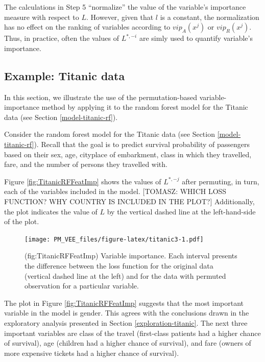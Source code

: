 \documentclass[12pt,]{krantz}
\begin{document}
The calculations in Step 5 ``normalize'' the value of the variable's importance measure with respect to \(L\). However, given that \(l\) is a constant, the normalization has no effect on the ranking of variables according to \(vip_A(x^j)\) or \(vip_R(x^j)\). Thus, in practice, often the values of \(L^{*,-i}\) are simly used to quantify variable's importance.

\hypertarget{featureImportanceTitanic}{%
\subsection{Example: Titanic data}\label{featureImportanceTitanic}}

In this section, we illustrate the use of the permutation-based variable-importance method by applying it to the random forest model for the Titanic data (see Section \ref{model-titanic-rf}).

Consider the random forest model for the Titanic data (see Section \ref{model-titanic-rf}). Recall that the goal is to predict survival probability of passengers based on their sex, age, cityplace of embarkment, class in which they travelled, fare, and the number of persons they travelled with.

Figure \ref{fig:TitanicRFFeatImp} shows the values of \(L^{*,-j}\) after permuting, in turn, each of the variables included in the model. {[}TOMASZ: WHICH LOSS FUNCTION? WHY COUNTRY IS INCLUDED IN THE PLOT?{]} Additionally, the plot indicates the value of \(L\) by the vertical dashed line at the left-hand-side of the plot.

\begin{figure}
\centering
\texttt{[image: PM\_VEE\_files/figure-latex/titanic3-1.pdf]}
\caption{\label{fig:titanic3}(fig:TitanicRFFeatImp) Variable importance. Each interval presents the difference between the loss function for the original data (vertical dashed line at the left) and for the data with permuted observation for a particular variable.}
\end{figure}

The plot in Figure \ref{fig:TitanicRFFeatImp} suggests that the most important variable in the model is gender. This agrees with the conclusions drawn in the exploratory analysis presented in Section \ref{exploration-titanic}. The next three important variables are class of the travel (first-class patients had a higher chance of survival), age (children had a higher chance of survival), and fare (owners of more expensive tickets had a higher chance of survival).
\end{document}
